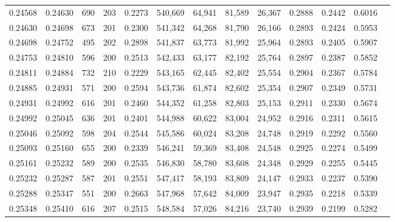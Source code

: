 \begin{tabular}{rrrrrrrrrrrrr}
0.24568 & 0.24630 &   690 & 203 &                                     0.2273 & 540,669 &  64,941 &  81,589 &  26,367 & 0.2888 & 0.2442 & 0.6016 \\
0.24630 & 0.24698 &   673 & 201 &                                     0.2300 & 541,342 &  64,268 &  81,790 &  26,166 & 0.2893 & 0.2424 & 0.5953 \\
0.24698 & 0.24752 &   495 & 202 &                                     0.2898 & 541,837 &  63,773 &  81,992 &  25,964 & 0.2893 & 0.2405 & 0.5907 \\
0.24753 & 0.24810 &   596 & 200 &                                     0.2513 & 542,433 &  63,177 &  82,192 &  25,764 & 0.2897 & 0.2387 & 0.5852 \\
0.24811 & 0.24884 &   732 & 210 &                                     0.2229 & 543,165 &  62,445 &  82,402 &  25,554 & 0.2904 & 0.2367 & 0.5784 \\
0.24885 & 0.24931 &   571 & 200 &                                     0.2594 & 543,736 &  61,874 &  82,602 &  25,354 & 0.2907 & 0.2349 & 0.5731 \\
0.24931 & 0.24992 &   616 & 201 &                                     0.2460 & 544,352 &  61,258 &  82,803 &  25,153 & 0.2911 & 0.2330 & 0.5674 \\
0.24992 & 0.25045 &   636 & 201 &                                     0.2401 & 544,988 &  60,622 &  83,004 &  24,952 & 0.2916 & 0.2311 & 0.5615 \\
0.25046 & 0.25092 &   598 & 204 &                                     0.2544 & 545,586 &  60,024 &  83,208 &  24,748 & 0.2919 & 0.2292 & 0.5560 \\
0.25093 & 0.25160 &   655 & 200 &                                     0.2339 & 546,241 &  59,369 &  83,408 &  24,548 & 0.2925 & 0.2274 & 0.5499 \\
0.25161 & 0.25232 &   589 & 200 &                                     0.2535 & 546,830 &  58,780 &  83,608 &  24,348 & 0.2929 & 0.2255 & 0.5445 \\
0.25232 & 0.25287 &   587 & 201 &                                     0.2551 & 547,417 &  58,193 &  83,809 &  24,147 & 0.2933 & 0.2237 & 0.5390 \\
0.25288 & 0.25347 &   551 & 200 &                                     0.2663 & 547,968 &  57,642 &  84,009 &  23,947 & 0.2935 & 0.2218 & 0.5339 \\
0.25348 & 0.25410 &   616 & 207 &                                     0.2515 & 548,584 &  57,026 &  84,216 &  23,740 & 0.2939 & 0.2199 & 0.5282 \\

\end{tabular}
